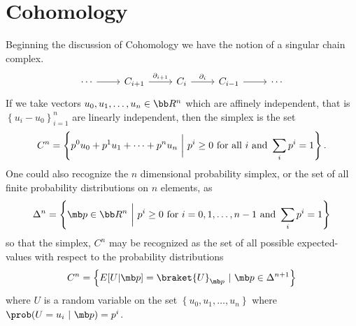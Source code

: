 
\section{Cohomology}

Beginning the discussion of Cohomology we have the notion of a singular chain
complex.  
\begin{equation*} 
    \begin{tikzcd} 
        \cdots \ar[r] & C_{i+1} \ar[r,"\partial_{i+1}"] & C_i 
        \ar[r, "\partial_i"] & C_{i-1} \ar[r] & \cdots
    \end{tikzcd} 
\end{equation*} 
If we take vectors $u_0, u_1, \ldots, u_n \in \bb R^n$ which are affinely independent, 
that is $\left\{ u_i-u_0 \right\}_{i=1}^n$ are linearly independent, 
then the simplex is the set 
\begin{equation*} 
    C^n = \left\{  p^0u_0+p^1u_1+\cdots+p^nu_n ~\biggr |~ p^i \geq 0 \textup{ for all
    } i \textup{ and } \sum_{i} p^i = 1 \right\}.  
\end{equation*} 
One could also recognize the $n$ dimensional probability simplex, or the set of all
finite probability distributions on $n$ elements, as 
\begin{equation*}
    \Delta^n = \left\{ \mb p \in \bb R^n ~\biggr |~ p^i \geq 0 \textup{ for } 
    i=0,1,\ldots,{n-1} \textup{ and } \sum_i p^i = 1 \right\}
\end{equation*} 
so that the simplex, $C^n$ may be recognized as the set of all possible expected-values 
with respect to the probability distributions
\begin{equation*} 
    C^n = \left\{ E[U|\mb p] = \braket{U}_{\mb p} ~|~ \mb p
        \in \Delta^{n+1}\right\} 
\end{equation*} 
where $U$ is a random variable on the set $\left\{ u_0, u_1, \ldots, u_n \right\}$ 
where $\prob(U=u_i ~|~ \mb p) = p^i$.

